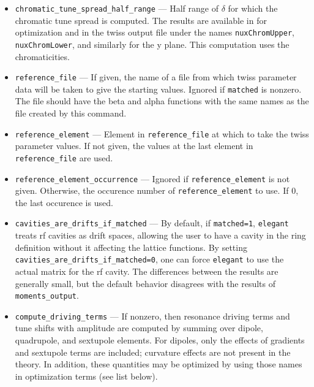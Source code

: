 \documentclass[11pt]{article}
\begin{document}
\begin{itemize}
\item \verb|chromatic_tune_spread_half_range| --- Half range of $\delta$ for which the
        chromatic tune spread is computed.  The results are available in for optimization  and
        in the twiss output file under the names \verb|nuxChromUpper|, \verb|nuxChromLower|, 
        and similarly for the y plane.  This computation uses the chromaticities.

\item \verb|reference_file| --- If given, the name of a file from which twiss parameter data will
        be taken to give the starting values.  Ignored if \verb|matched| is nonzero.  The file
        should have the beta and alpha functions with the same names as the file created by
        this command.
\item \verb|reference_element| --- Element in \verb|reference_file| at which to take the
        twiss parameter values.  If not given, the values at the last element in \verb|reference_file|
        are used.
\item \verb|reference_element_occurrence| --- Ignored if \verb|reference_element| is not given.
        Otherwise, the occurence number of \verb|reference_element| to use.  If 0, the last
        occurence is used.
\item \verb|cavities_are_drifts_if_matched| --- By default,  if \verb|matched=1|, {\tt elegant} treats rf cavities
  as drift spaces, allowing the user to have a cavity in the ring definition without it affecting the lattice functions.
  By setting \verb|cavities_are_drifts_if_matched=0|, one can force {\tt elegant} to use the actual matrix for the
  rf cavity.  The differences between the 
  results are generally small, but the default behavior disagrees with the results of \verb|moments_output|.
\item \verb|compute_driving_terms| --- If nonzero, then resonance driving terms \cite{Bengtsson} and
 tune shifts with amplitude are computed by summing over dipole, quadrupole, and sextupole elements.  For dipoles, only the effects of gradients and
 sextupole terms are included; curvature effects are not present in the theory.   In addition, these quantities may be optimized 
 by using those names in optimization terms (see list below).
\end{itemize}
\end{document}
